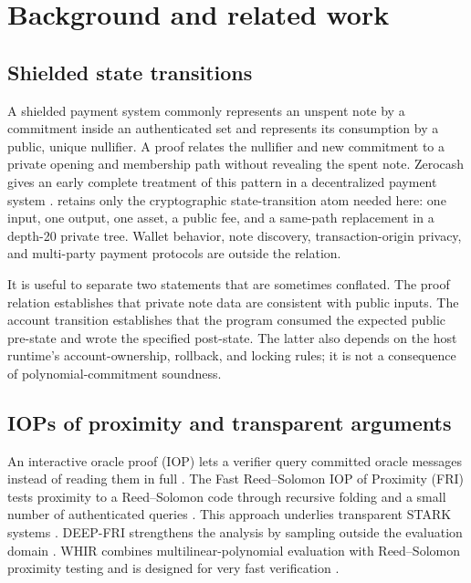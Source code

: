 \section{Background and related work}\label{sec:background}

\subsection{Shielded state transitions}

A shielded payment system commonly represents an unspent note by a commitment
inside an authenticated set and represents its consumption by a public,
unique nullifier.  A proof relates the nullifier and new commitment to a
private opening and membership path without revealing the spent note.
Zerocash gives an early complete treatment of this pattern in a decentralized
payment system \cite{BenSassonEtAl2014Zerocash}.  \Profile{} retains only the
cryptographic state-transition atom needed here: one input, one output, one
asset, a public fee, and a same-path replacement in a depth-20 private tree.
Wallet behavior, note discovery, transaction-origin privacy, and multi-party
payment protocols are outside the relation.

It is useful to separate two statements that are sometimes conflated.  The
proof relation establishes that private note data are consistent with public
inputs.  The account transition establishes that the program consumed the
expected public pre-state and wrote the specified post-state.  The latter also
depends on the host runtime's account-ownership, rollback, and locking rules;
it is not a consequence of polynomial-commitment soundness.

\subsection{IOPs of proximity and transparent arguments}

An interactive oracle proof (IOP) lets a verifier query committed oracle
messages instead of reading them in full
\cite{BenSassonChiesaSpooner2016}.  The Fast Reed--Solomon IOP of Proximity
(FRI) tests
proximity to a Reed--Solomon code through recursive folding and a small number
of authenticated queries
\cite{BenSassonBentovHoreshRiabzev2018FRI}.  This approach underlies
transparent STARK systems
\cite{BenSassonBentovHoreshRiabzev2018STARK}.  DEEP-FRI strengthens the
analysis by sampling outside the evaluation domain
\cite{BenSassonGoldbergKoppartySaraf2020}.  WHIR combines multilinear-polynomial evaluation
with Reed--Solomon proximity testing and is designed for very fast
verification \cite{ArnonChiesaFenziYogev2025WHIR}.

